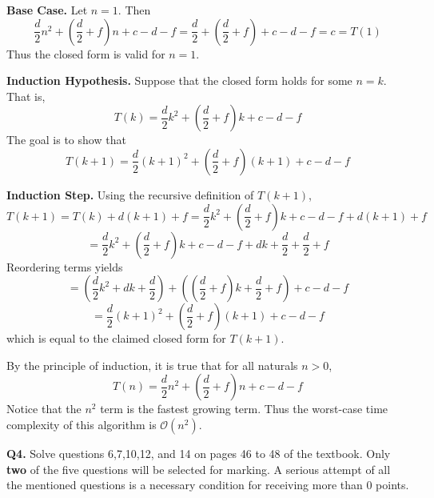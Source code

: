 \documentclass[11pt]{article}
\begin{document}
\begin{enumerate}[label=(\alph*)]
        \textbf{Base Case.} Let \(n=1\). Then
        \[
            \frac{d}{2}n^2 + \left(\frac{d}{2} + f\right)n + c-d-f = \frac{d}{2} + \left(\frac{d}{2} + f\right) + c - d - f = c = T(1)
        \]
        Thus the closed form is valid for \(n=1\).

        \textbf{Induction Hypothesis.} Suppose that the closed form holds for some \(n=k\). That is,
        \[
            T(k) = \frac{d}{2}k^2 + \left(\frac{d}{2} + f\right)k + c-d-f
        \]
        The goal is to show that
        \[
            T(k+1) = \frac{d}{2}(k+1)^2 + \left(\frac{d}{2} + f\right)(k+1) + c - d - f
        \]

        \textbf{Induction Step.} Using the recursive definition of \(T(k+1)\),
        \[
            T(k+1) = T(k) + d(k+1) + f = \frac{d}{2}k^2 + \left(\frac{d}{2} + f\right)k + c-d-f + d(k+1) + f
        \]
        \[
            = \frac{d}{2}k^2 + \left(\frac{d}{2} + f\right)k + c- d - f + dk+\frac{d}{2} + \frac{d}{2} + f
        \]
        Reordering terms yields
        \[
            = \left(\frac{d}{2}k^2 + dk + \frac{d}{2}\right) + \left(\left(\frac{d}{2} + f\right)k + \frac{d}{2} + f\right) + c - d - f
        \]
        \[
            = \frac{d}{2}(k+1)^2 + \left(\frac{d}{2} + f\right)(k+1) + c - d - f
        \]
        which is equal to the claimed closed form for \(T(k+1)\).

        By the principle of induction, it is true that for all naturals \(n >0\),
        \[
            T(n) = \frac{d}{2}n^2 + \left(\frac{d}{2} + f\right)n + c-d-f
        \]
        Notice that the \(n^2\) term is the fastest growing term. Thus the worst-case time complexity of this algorithm is \(\mathcal{O} (n^2)\).
    \end{enumerate}
    \pagebreak
    \textbf{Q4.} Solve questions 6,7,10,12, and 14 on pages 46 to 48 of the textbook. Only \textbf{two} of the five questions will be selected for marking. A serious attempt of all the mentioned questions is a necessary condition for receiving more than 0 points.
\end{document}

